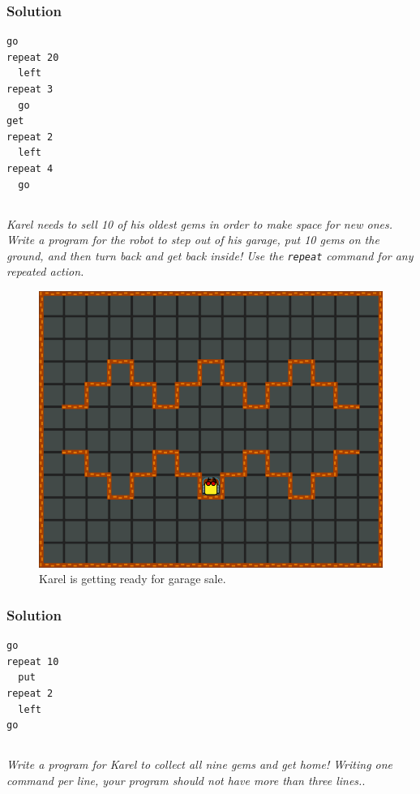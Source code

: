 \documentclass[article,A4,12pt]{llncs}
\begin{document}
{{{{\subsubsection{Solution}
\begin{verbatim}
go
repeat 20
  left
repeat 3 
  go
get
repeat 2
  left
repeat 4
  go
\end{verbatim}

\newpage
\subsection{}

{\em Karel needs to sell 10 of his oldest gems in order to make space for new ones. 
Write a program for the robot to step out of his garage, put 10 gems on the ground, 
and then turn back and get back inside! Use the {\tt repeat} command for any repeated 
action.}


\begin{figure}[!ht]
\begin{center}
\includegraphics[height=0.4\textwidth]{imgk/c04.png}
\end{center}
\vspace{-4mm}
\caption{Karel is getting ready for garage sale.}
\label{fig:c04}
\vspace{-10mm}
\end{figure}
\noindent

\subsubsection{Solution}
\begin{verbatim}
go
repeat 10
  put
repeat 2
  left
go
\end{verbatim}


\newpage
\subsection{}

{\em Write a program for Karel to collect all nine gems and get home! 
Writing one command per line, your program should not have more 
than three lines.}.

}}}}
\end{document}
